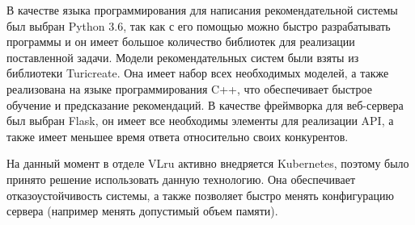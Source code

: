 В качестве языка программирования для написания рекомендательной системы был
выбран Python 3.6, так как с его помощью можно быстро разрабатывать программы и
он имеет большое количество библиотек для реализации поставленной задачи. Модели
рекомендательных систем были взяты из библиотеки Turicreate. Она имеет набор всех
необходимых моделей, а также реализована на языке программирования C++, что обеспечивает
быстрое обучение и предсказание рекомендаций. В качестве фреймворка для веб-сервера
был выбран Flask, он имеет все необходимы элементы для реализации API, а также
имеет меньшее время ответа относительно своих конкурентов.

На данный момент в отделе VLru активно внедряется Kubernetes, поэтому было принято решение
использовать данную технологию. Она обеспечивает отказоустойчивость системы, а также
позволяет быстро менять конфигурацию сервера (например менять допустимый объем памяти).
